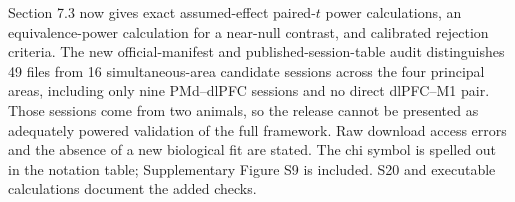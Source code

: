 \documentclass[11pt,a4paper]{article}
\begin{document}
Section 7.3 now gives exact assumed-effect paired-$t$ power calculations, an equivalence-power calculation for a near-null contrast, and calibrated rejection criteria. The new official-manifest and published-session-table audit distinguishes 49 files from 16 simultaneous-area candidate sessions across the four principal areas, including only nine PMd--dlPFC sessions and no direct dlPFC--M1 pair. Those sessions come from two animals, so the release cannot be presented as adequately powered validation of the full framework. Raw download access errors and the absence of a new biological fit are stated. The chi symbol is spelled out in the notation table; Supplementary Figure S9 is included. S20 and executable calculations document the added checks.
\end{document}
